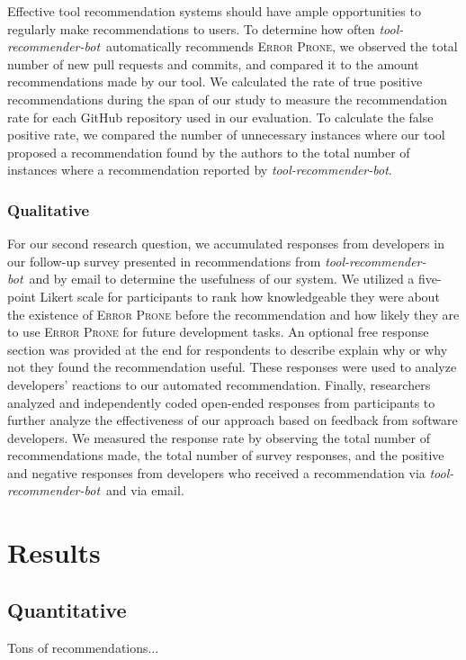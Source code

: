 \documentclass[sigconf,review,anonymous]{acmart}
\newcommand{\tool}{\textsl{tool-recommender-bot}}
\begin{document}
Effective tool recommendation systems should have ample opportunities to regularly make recommendations to users. To determine how often \tool~automatically recommends \textsc{Error Prone}, we observed the total number of new pull requests and commits, and compared it to the amount recommendations made by our tool. We calculated the rate of true positive recommendations during the span of our study to measure the recommendation rate for each GitHub repository used in our evaluation. To calculate the false positive rate, we compared the number of unnecessary instances where our tool proposed a recommendation found by the authors to the total number of instances where a recommendation reported by \tool.

\subsubsection{Qualitative}

For our second research question, we accumulated responses from developers in our follow-up survey presented in recommendations from \tool~and by email to determine the usefulness of our system. We utilized a five-point Likert scale for participants to rank how knowledgeable they were about the existence of \textsc{Error Prone} before the recommendation and how likely they are to use \textsc{Error Prone} for future development tasks. An optional free response section was provided at the end for respondents to describe explain why or why not they found the recommendation useful. These responses were used to analyze developers' reactions to our automated recommendation. Finally, researchers analyzed and independently coded open-ended responses from participants to further analyze the effectiveness of our approach based on feedback from software developers. We measured the response rate by observing the total number of recommendations made, the total number of survey responses, and the positive and negative responses from developers who received a recommendation via \tool~and via email.

\section{Results}

\subsection{Quantitative}

Tons of recommendations... \\
\end{document}
